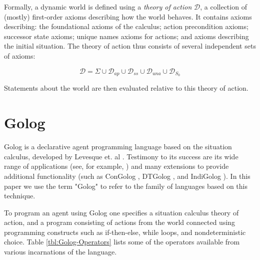 \documentclass[letterpaper]{article}
\begin{document}
Formally, a dynamic world is defined using a \emph{theory of action}
$\mathcal{D}$, a collection of (mostly) first-order axioms describing
how the world behaves. It contains axioms describing: the foundational
axioms of the calculus; action precondition axioms; successor state
axioms; unique names axioms for actions; and axioms describing the
initial situation. The theory of action thus consists of several independent
sets of axioms:

\[
\mathcal{D}=\Sigma\cup\mathcal{D}_{ap}\cup\mathcal{D}_{ss}\cup\mathcal{D}_{una}\cup\mathcal{D}_{S_{0}}
\]


Statements about the world are then evaluated relative to this theory
of action.


\section{Golog}

\label{sec:Golog}

Golog is a declarative agent programming language based on the situation
calculus, developed by Levesque et. al \cite{levesque97golog}. Testimony
to its success are its wide range of applications (see, for example,
\cite{levesque97golog,Ferrein2005readylog} ) and many extensions
to provide additional functionality (such as ConGolog \cite{giacomo00congolog},
DTGolog \cite{boutilier00dtgolog}, and IndiGolog \cite{giacomo99indigolog}).
In this paper we use the term "Golog" to refer to the family
of languages based on this technique.

To program an agent using Golog one specifies a situation calculus
theory of action, and a program consisting of actions from the world
connected using programming constructs such as if-then-else, while
loops, and nondeterministic choice. Table \ref{tbl:Golog-Operators}
lists some of the operators available from various incarnations of
the language.
\end{document}
